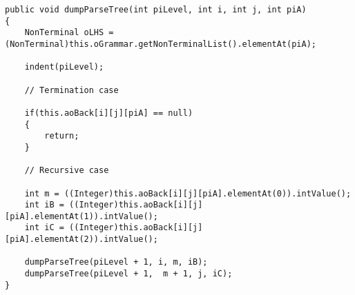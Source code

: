 \tiny
\begin{verbatim}
public void dumpParseTree(int piLevel, int i, int j, int piA)
{
    NonTerminal oLHS = (NonTerminal)this.oGrammar.getNonTerminalList().elementAt(piA);

    indent(piLevel);

    // Termination case

    if(this.aoBack[i][j][piA] == null)
    {
        return;
    }

    // Recursive case

    int m = ((Integer)this.aoBack[i][j][piA].elementAt(0)).intValue();
    int iB = ((Integer)this.aoBack[i][j][piA].elementAt(1)).intValue();
    int iC = ((Integer)this.aoBack[i][j][piA].elementAt(2)).intValue();

    dumpParseTree(piLevel + 1, i, m, iB);
    dumpParseTree(piLevel + 1,  m + 1, j, iC);
}
\end{verbatim}
\normalsize

